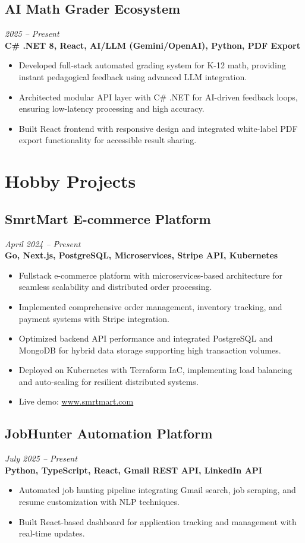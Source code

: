 \documentclass[11pt,a4paper]{article}
\begin{document}
\subsection*{AI Math Grader Ecosystem}
\textit{2025 -- Present} \\
\textbf{C\# .NET 8, React, AI/LLM (Gemini/OpenAI), Python, PDF Export}
\begin{itemize}[noitemsep]
\item Developed full-stack automated grading system for K-12 math, providing instant pedagogical feedback using advanced LLM integration.
\item Architected modular API layer with C\# .NET for AI-driven feedback loops, ensuring low-latency processing and high accuracy.
\item Built React frontend with responsive design and integrated white-label PDF export functionality for accessible result sharing.
\end{itemize}

\section*{Hobby Projects}

\subsection*{SmrtMart E-commerce Platform}
\textit{April 2024 -- Present} \\
\textbf{Go, Next.js, PostgreSQL, Microservices, Stripe API, Kubernetes}
\begin{itemize}[noitemsep]
\item Fullstack e-commerce platform with microservices-based architecture for seamless scalability and distributed order processing.
\item Implemented comprehensive order management, inventory tracking, and payment systems with Stripe integration.
\item Optimized backend API performance and integrated PostgreSQL and MongoDB for hybrid data storage supporting high transaction volumes.
\item Deployed on Kubernetes with Terraform IaC, implementing load balancing and auto-scaling for resilient distributed systems.
\item Live demo: \href{https://www.smrtmart.com}{www.smrtmart.com}
\end{itemize}

\subsection*{JobHunter Automation Platform}
\textit{July 2025 -- Present} \\
\textbf{Python, TypeScript, React, Gmail REST API, LinkedIn API}
\begin{itemize}[noitemsep]
\item Automated job hunting pipeline integrating Gmail search, job scraping, and resume customization with NLP techniques.
\item Built React-based dashboard for application tracking and management with real-time updates.
\end{itemize}
\end{document}
